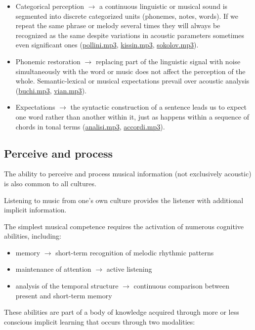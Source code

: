 \begin{itemize}
\item Categorical perception \(\rightarrow\) a continuous linguistic or musical sound is segmented into discrete categorized units (phonemes, notes, words). If we repeat the same phrase or melody several times they will always be recognized as the same despite variations in acoustic parameters sometimes even significant ones (\href{URL}{pollini.mp3}, \href{URL}{kissin.mp3}, \href{URL}{sokolov.mp3}).
\item Phonemic restoration \(\rightarrow\) replacing part of the linguistic signal with noise simultaneously with the word or music does not affect the perception of the whole. Semantic-lexical or musical expectations prevail over acoustic analysis (\href{URL}{buchi.mp3},  \href{URL}{vian.mp3}).
\item Expectations \(\rightarrow\) the syntactic construction of a sentence leads us to expect one word rather than another within it, just as happens within a sequence of chords in tonal terms (\href{URL}{analisi.mp3}, \href{URL}{accordi.mp3}).
\end{itemize}

\subsection{Perceive and process }\label{perceive-and-process}

The ability to perceive and process musical information (not exclusively acoustic) is also common to all cultures.

Listening to music from one's own culture provides the listener with additional implicit information.

The simplest musical competence requires the activation of numerous cognitive abilities, including: 

\begin{itemize}
\item memory \(\rightarrow\) short-term recognition of melodic rhythmic patterns
\item maintenance of attention \(\rightarrow\) active listening
\item analysis of the temporal structure \(\rightarrow\) continuous comparison between present and short-term memory
\end{itemize}

These abilities are part of a body of knowledge acquired through more or less conscious implicit learning that occurs through two modalities:

